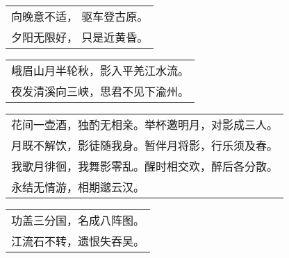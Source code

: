 \nopagebreak%
\nopagebreak%
\noindent\begin{minipage}{\linewidth}
  \vskip-3pt\begin{table}[H]
    \centering
    \begin{tabular}{@{}l@{}}
向晚意不适， 驱车登古原。\\
夕阳无限好， 只是近黄昏。
    \end{tabular}
  \end{table}
\end{minipage}
\vspace{1cm}


\nopagebreak%
\nopagebreak%
\noindent\begin{minipage}{\linewidth}
  \vskip-3pt\begin{table}[H]
    \centering
    \begin{tabular}{@{}l@{}}
峨眉山月半轮秋，影入平羌江水流。\\
夜发清溪向三峡，思君不见下渝州。
    \end{tabular}
  \end{table}
\end{minipage}
\vspace{1cm}


\nopagebreak%
\nopagebreak%
\noindent\begin{minipage}{\linewidth}
  \vskip-3pt\begin{table}[H]
    \centering
    \begin{tabular}{@{}l@{}}
花间一壶酒，独酌无相亲。举杯邀明月，对影成三人。\\
月既不解饮，影徒随我身。暂伴月将影，行乐须及春。\\
我歌月徘徊，我舞影零乱。醒时相交欢，醉后各分散。\\
永结无情游，相期邈云汉。
    \end{tabular}
  \end{table}
\end{minipage}
\vspace{1cm}


\nopagebreak%
\nopagebreak%
\noindent\begin{minipage}{\linewidth}
  \vskip-3pt\begin{table}[H]
    \centering
    \begin{tabular}{@{}l@{}}
功盖三分国，名成八阵图。\\
江流石不转，遗恨失吞吴。
    \end{tabular}
  \end{table}
\end{minipage}
\vspace{1cm}


